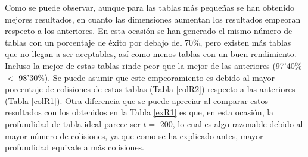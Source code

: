 \documentclass[12pt,spanish,listoffigures,listoftables,listofalgorithms]{tfgetsinf}
\begin{document}
\def\arraystretch{1.5}
\begin{table}[H]
	\centering
	\caption{Porcentajes de éxito para las tablas que emplean \textbf{R2}}
	\label{exR2}
\end{table}

Como se puede observar, aunque para las tablas más pequeñas se han obtenido mejores resultados, en cuanto las dimensiones aumentan los resultados empeoran respecto a los anteriores. En esta ocasión se han generado el mismo número de tablas con un porcentaje de éxito por debajo del 70\%, pero existen más tablas que no llegan a ser aceptables, así como menos tablas con un buen rendimiento. Incluso la mejor de estas tablas rinde peor que la mejor de las anteriores (97'40\% $<$ 98'30\%). Se puede asumir que este empeoramiento es debido al mayor porcentaje de colisiones de estas tablas (Tabla \ref{colR2}) respecto a las anteriores (Tabla \ref{colR1}). Otra diferencia que se puede apreciar al comparar estos resultados con los obtenidos en la Tabla \ref{exR1} es que, en esta ocasión, la profundidad de tabla ideal parece ser $t =$ 200, lo cual es algo razonable debido al mayor número de colisiones, ya que como se ha explicado antes, mayor profundidad equivale a más colisiones.
\end{document}
